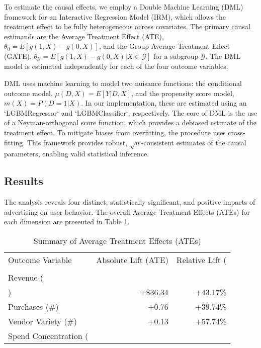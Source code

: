 To estimate the causal effects, we employ a Double Machine Learning (DML) framework for an Interactive Regression Model (IRM), which allows the treatment effect to be fully heterogeneous across covariates. The primary causal estimands are the Average Treatment Effect (ATE), $\theta_0 = E[g(1, X) - g(0, X)]$, and the Group Average Treatment Effect (GATE), $\theta_{\mathcal{G}} = E[g(1, X) - g(0, X) | X \in \mathcal{G}]$ for a subgroup $\mathcal{G}$. The DML model is estimated independently for each of the four outcome variables.

DML uses machine learning to model two nuisance functions: the conditional outcome model, $\mu(D, X) = E[Y | D, X]$, and the propensity score model, $m(X) = P(D=1 | X)$. In our implementation, these are estimated using an `LGBMRegressor` and `LGBMClassifier`, respectively. The core of DML is the use of a Neyman-orthogonal score function, which provides a debiased estimate of the treatment effect. To mitigate biases from overfitting, the procedure uses cross-fitting. This framework provides robust, $\sqrt{n}$-consistent estimates of the causal parameters, enabling valid statistical inference.

\subsection*{Results}

The analysis reveals four distinct, statistically significant, and positive impacts of advertising on user behavior. The overall Average Treatment Effects (ATEs) for each dimension are presented in Table \ref{tab:ate_summary}.

\begin{table}[htbp!]
\centering
\caption{Summary of Average Treatment Effects (ATEs)}
\label{tab:ate_summary}
\begin{tabular}{lrr}
\toprule
Outcome Variable & Absolute Lift (ATE) & Relative Lift (\\%
\\
\midrule
Revenue (\\) & +\$36.34 & +43.17\%
\\
Purchases (\#) & +0.76 & +39.74\%
\\
Vendor Variety (\#) & +0.13 & +57.74\%
\\
Spend Concentration (%
\\
\bottomrule
\end{tabular}
\end{table}

